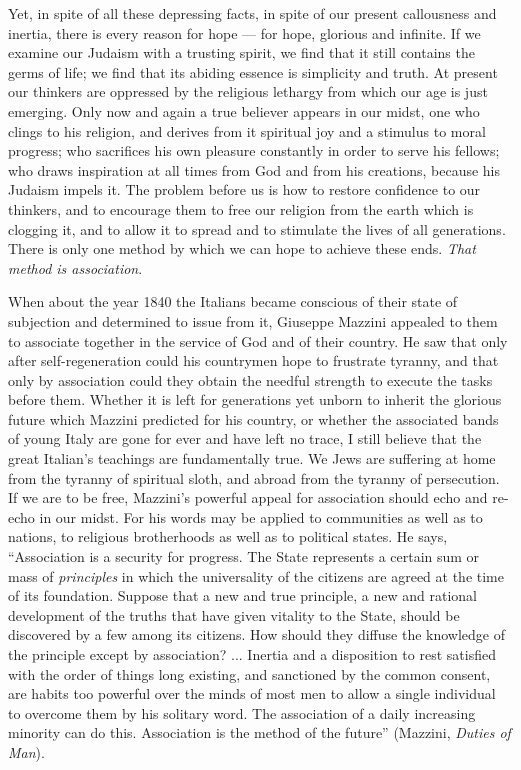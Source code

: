 Yet, in spite of all these depressing facts, in spite of 
our present callousness and inertia, there is every reason 
for hope — for hope, glorious and infinite. If we examine 
our Judaism with a trusting spirit, we find that it still contains the germs of life; we find that its abiding essence is 
simplicity and truth. At present our thinkers are oppressed by the religious lethargy from which our age is just 
emerging. Only now and again a true believer appears 
in our midst, one who clings to his religion, and derives 
from it spiritual joy and a stimulus to moral progress; who 
sacrifices his own pleasure constantly in order to serve his 
fellows; who draws inspiration at all times from God and 
from his creations, because his Judaism impels it. The 
problem before us is how to restore confidence to our 
thinkers, and to encourage them to free our religion from 
the earth which is clogging it, and to allow it to spread 
and to stimulate the lives of all generations. There is only 
one method by which we can hope to achieve these ends. 
\textsl{That method is association}.

When about the year 1840 the Italians became conscious of their state of subjection and determined to 
issue from it, Giuseppe Mazzini appealed to them to 
associate together in the service of God and of their 
country. He saw that only after self-regeneration could 
his countrymen hope to frustrate tyranny, and that only 
by association could they obtain the needful strength 
to execute the tasks before them. Whether it is left for 
generations yet unborn to inherit the glorious future which 
Mazzini predicted for his country, or whether the associated 
bands of young Italy are gone for ever and have left no 
trace, I still believe that the great Italian's teachings are 
fundamentally true. We Jews are suffering at home from 
the tyranny of spiritual sloth, and abroad from the tyranny 
of persecution. If we are to be free, Mazzini's powerful 
appeal for association should echo and re-echo in our midst. 
For his words may be applied to communities as well as to 
nations, to religious brotherhoods as well as to political 
states. He says, ``Association is a security for progress. 
The State represents a certain sum or mass of \textsl{principles} in 
which the universality of the citizens are agreed at the 
time of its foundation. Suppose that a new and true 
principle, a new and rational development of the truths 
that have given vitality to the State, should be discovered 
by a few among its citizens. How should they diffuse the 
knowledge of the principle except by association? ...
Inertia and a disposition to rest satisfied with the order 
of things long existing, and sanctioned by the common 
consent, are habits too powerful over the minds of most 
men to allow a single individual to overcome them by 
his solitary word. The association of a daily increasing 
minority can do this. Association is the method of the 
future'' (Mazzini, \textsl{Duties of Man}). 

